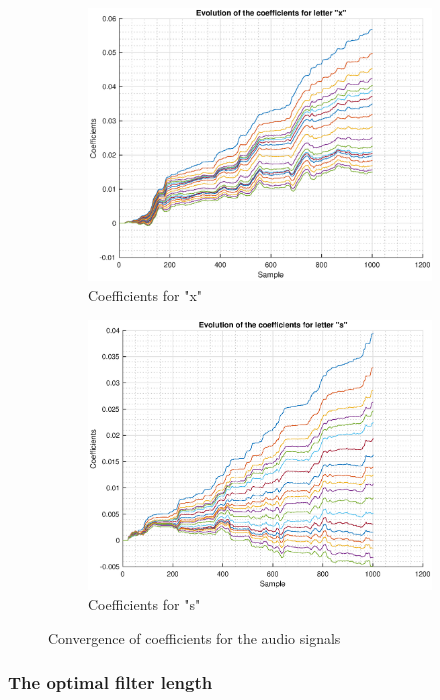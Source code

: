 \documentclass{article}
\begin{document}
\begin{figure}[h!]
\begin{subfigure}{0.24\textwidth}
\includegraphics[width = \textwidth]{speech_x}
\caption{Coefficients for "x"}
\label{fig:speech_x}
\end{subfigure}
\begin{subfigure}{0.24\textwidth}
\centering
\includegraphics[width = \textwidth]{speech_s}
\caption{Coefficients for "s"}
\label{fig:speech_s}
\end{subfigure}
\caption{Convergence of coefficients for the audio signals}
\label{fig:speech_converge}
\end{figure}


\subsubsection{The optimal filter length}
\end{document}
